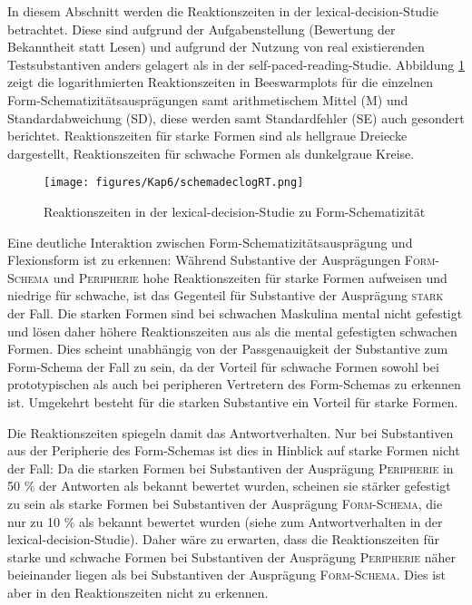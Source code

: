 In diesem Abschnitt werden die Reaktionszeiten in der lexical-decision-Studie betrachtet. Diese sind aufgrund der Aufgabenstellung (Bewertung der Bekanntheit statt Lesen) und aufgrund der Nutzung von real existierenden Testsubstantiven anders gelagert als in der self-paced-reading-Studie. Abbildung \ref{schemadeclogRT} zeigt die logarithmierten Reaktionszeiten in Beeswarmplots für die einzelnen Form-Schema\-ti\-zi\-täts\-aus\-prägungen samt arithmetischem Mittel (M) und Standardabweichung (SD), diese werden samt Standardfehler (SE) auch gesondert berichtet. Reaktionszeiten für starke Formen sind als hellgraue Dreiecke dargestellt, Reaktionszeiten für schwache Formen als dunkelgraue Kreise. 

\begin{figure}
\texttt{[image: figures/Kap6/schemadeclogRT.png]} 
\caption{{\footnotesize{Reaktionszeiten in der lexical-decision-Studie zu Form-Schematizität}}}
\label{schemadeclogRT}
\end{figure}

Eine deutliche Interaktion zwischen Form-Schematizitätsausprägung und Flexionsform ist zu erkennen: Während Substantive der Ausprägungen \textsc{Form-Sche\-ma} und \textsc{Peripherie} hohe Reaktionszeiten für starke Formen aufweisen und niedrige für schwache, ist das Gegenteil für Substantive der Ausprägung \textsc{stark} der Fall. Die starken Formen sind bei schwachen Maskulina mental nicht gefestigt und lösen daher höhere Reaktionszeiten aus als die mental gefestigten schwachen Formen. Dies scheint unabhängig von der Passgenauigkeit der Substantive zum Form-Schema der Fall zu sein, da der Vorteil für schwache Formen sowohl bei prototypischen als auch bei peripheren Vertretern des Form-Schemas zu erkennen ist. Umgekehrt besteht für die starken Substantive ein Vorteil für starke Formen. 


Die Reaktionszeiten spiegeln damit das Antwortverhalten. Nur bei Substantiven aus der Peripherie des Form-Schemas ist dies in Hinblick auf starke Formen nicht der Fall: Da die starken Formen bei Substantiven der Ausprägung \textsc{Peripherie} in 50 \% der Antworten als bekannt bewertet wurden, scheinen sie stärker gefestigt zu sein als starke Formen bei Substantiven der Ausprägung \textsc{Form-Schema}, die nur zu 10 \% als bekannt bewertet wurden (siehe  zum Antwortverhalten in der lexical-decision-Studie). Daher wäre zu erwarten, dass die Reaktionszeiten für starke und schwache Formen bei Substantiven der Ausprägung \textsc{Peripherie} näher beieinander liegen als bei Substantiven der Ausprägung \textsc{Form-Schema}. Dies ist aber in den Reaktionszeiten nicht zu erkennen.   


